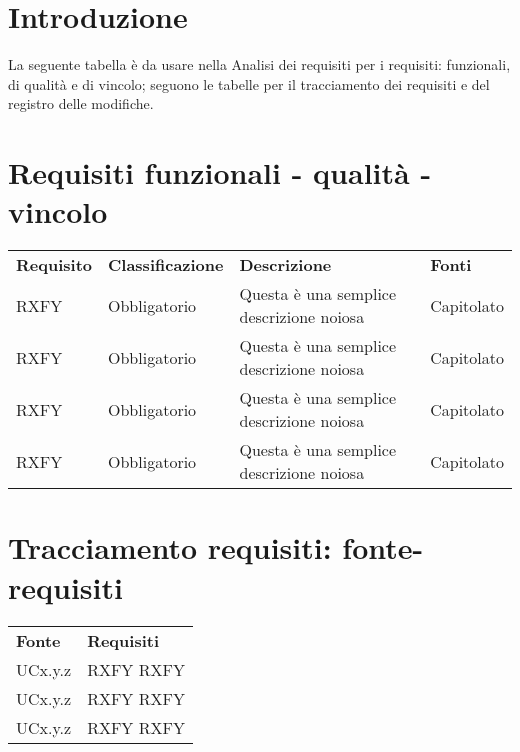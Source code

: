 \documentclass[12pt,a4paper]{article} %
\newcommand\Tstrut{\rule{0pt}{2.6ex}} %
\newcommand\Bstrut{\rule[-0.9ex]{0pt}{0pt}} %
\newcommand{\TBstrut}{\Tstrut\Bstrut} %
\begin{document}
\setcounter{secnumdepth}{0}
\section{Introduzione}
La seguente tabella è da usare nella Analisi dei requisiti per i requisiti: funzionali, di qualità e di vincolo; seguono le tabelle per il tracciamento dei requisiti e del registro delle modifiche.
\section*{Requisiti funzionali - qualità - vincolo}
	\begin{longtable} {
		>{\centering}p{24mm} 
		>{\centering}p{32mm}
		>{\centering}p{40mm} 
		>{}p{24.5mm}
		}
	\rowcolor{gray!50}
		\textbf{Requisito} & \textbf{Classificazione} & \textbf{Descrizione} & \textbf{Fonti} 	\TBstrut \\
		RXFY & Obbligatorio & Questa è una semplice descrizione noiosa & Capitolato \TBstrut \\ [2mm]
		RXFY & Obbligatorio & Questa è una semplice descrizione noiosa & Capitolato \TBstrut \\ [2mm]
		RXFY & Obbligatorio & Questa è una semplice descrizione noiosa & Capitolato \TBstrut \\ [2mm]
		RXFY & Obbligatorio & Questa è una semplice descrizione noiosa & Capitolato \TBstrut \\ [2mm]
	\end{longtable}
	
\section*{Tracciamento requisiti: fonte-requisiti}
	\begin{longtable} {
		>{\centering}p{64.5mm} 
		>{}p{64.5mm}
		}
	\rowcolor{gray!50}
		\textbf{Fonte} & \textbf{Requisiti} \TBstrut \\
		UCx.y.z & RXFY \newline RXFY  \TBstrut \\ [2mm]
		UCx.y.z & RXFY \newline RXFY  \TBstrut \\ [2mm]
		UCx.y.z & RXFY \newline RXFY  \TBstrut \\ [2mm]
	\end{longtable}
	
\end{document}
